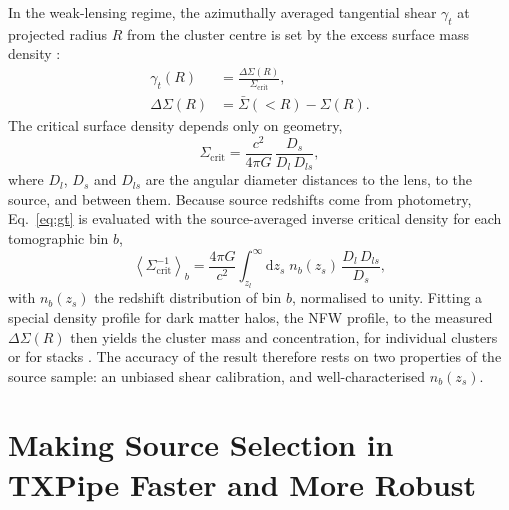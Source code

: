 \documentclass{article}
\begin{document}
In the weak-lensing regime, the azimuthally averaged tangential shear $\gamma_t$ at projected radius $R$ from the cluster centre is set by the excess surface mass density \citep[Part~2]{schneider_gravitational_2006}:
\begin{align}
  \gamma_t(R) &= \frac{\Delta\Sigma(R)}{\Sigma_\mathrm{crit}}, \label{eq:gt}\\
  \Delta\Sigma(R) &= \bar{\Sigma}(<R) - \Sigma(R). \label{eq:ds}
\end{align}
The critical surface density depends only on geometry,
\begin{equation}
  \Sigma_\mathrm{crit} = \frac{c^2}{4\pi G}\,\frac{D_s}{D_l\,D_{ls}}, \label{eq:sigcrit}
\end{equation}
where $D_l$, $D_s$ and $D_{ls}$ are the angular diameter distances to the lens, to the source, and between them. Because source redshifts come from photometry, Eq.~\eqref{eq:gt} is evaluated with the source-averaged inverse critical density for each tomographic bin $b$,
\begin{equation}
  \left\langle\Sigma_\mathrm{crit}^{-1}\right\rangle_b = \frac{4\pi G}{c^2}\int_{z_l}^{\infty} \mathrm{d}z_s\; n_b(z_s)\,\frac{D_l\,D_{ls}}{D_s}, \label{eq:sigcrit_avg}
\end{equation}
with $n_b(z_s)$ the redshift distribution of bin $b$, normalised to unity. Fitting a special density profile for dark matter halos, the NFW profile, to the measured $\Delta\Sigma(R)$ then yields the cluster mass and concentration, for individual clusters or for stacks \citep[e.g.][]{vitorelli_mass_2018}. The accuracy of the result therefore rests on two properties of the source sample: an unbiased shear calibration, and well-characterised $n_b(z_s)$.

\section{Making Source Selection in TXPipe Faster and More Robust}
\end{document}
